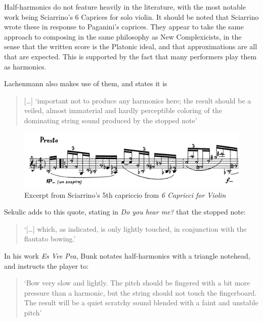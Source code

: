 Half-harmonics do not feature heavily in the literature, with the most notable work being Sciarrino's 6 Caprices for solo violin.\autocite{sciarrinoCapricciViolino1976} 
It should be noted that Sciarrino wrote these in response to Paganini's caprices. 
They appear to take the same approach to composing in the same philosophy as New Complexicists, in the sense that the written score is the Platonic ideal, and that approximations are all that are expected.
This is supported by the fact that many performers play them as harmonics.\autocite[]{appleseedFeedbackExploratorySession2019}


Lachenmann also makes use of them, and states it is
\begin{quotation}
  [\dots] `important not to produce any harmonics here; the result should be a veiled, almost immaterial and hardly perceptible coloring of the dominating string sound produced by the stopped note'\autocite[foreword]{lachenmannMusikFurStreichquartett1972}
\end{quotation}

\begin{figure}
  \includegraphics[width=\linewidth]{./resources/sciarrinoHalfHarmonicNotation.pdf}
  \caption{Excerpt from Sciarrino's 5th capriccio from \emph{6 Capricci for Violin}}\label{fig:sciarrinoExcerpt}\end{figure}

Sekulic adds to this quote, stating in \emph{Do you hear me?} that the stopped note:
\begin{quotation}
  `[\ldots] which, as indicated, is only lightly touched, in conjunction with the flautato bowing.'\autocite[28]{sekulicYouHearMe2012}
\end{quotation}

In his work \emph{Es Vee Pea}, Bunk notates half-harmonics with a triangle notehead, and instructs the player to: \begin{quotation}
  `Bow very slow and lightly. The pitch should be fingered with a bit more pressure than a harmonic, but the string should not touch the fingerboard. 
  The result will be a quiet scratchy sound blended with a faint and unstable pitch'
\end{quotation}\autocite[]{bunkEsVeePea2002}

